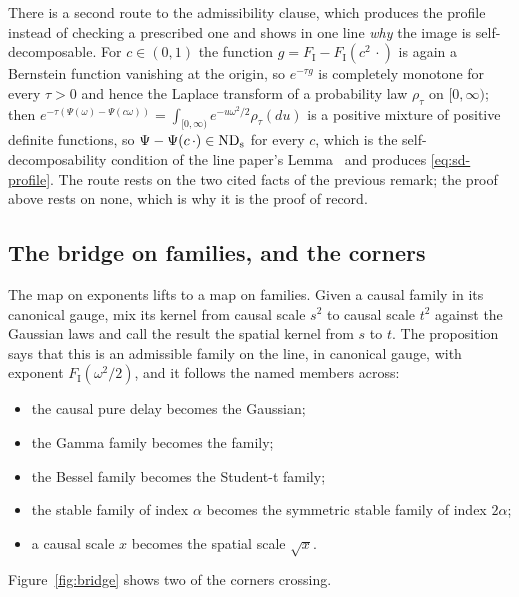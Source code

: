 \begin{remark}\label{rem:bridge-route}
There is a second route to the admissibility clause, which produces the profile instead of
checking a prescribed one and shows in one line \emph{why} the image is self-decomposable. For
$c \in (0,1)$ the function $g = F_{\mathrm I} - F_{\mathrm I}(c^2\,\cdot)$ is again a Bernstein
function vanishing at the origin, so $e^{-\tau g}$ is completely monotone for every $\tau > 0$
and hence the Laplace transform of a probability law $\rho_\tau$ on $[0,\infty)$; then
$e^{-\tau(\Psi(\omega) - \Psi(c\omega))} = \int_{[0,\infty)} e^{-u\omega^2/2}\rho_\tau(du)$ is a
positive mixture of positive definite functions, so $\Psi - \Psi(c\,\cdot) \in \mathrm{ND}_{\mathrm{s}}$ for every
$c$, which is the self-decomposability condition of the line paper's
Lemma~ and produces \ref{eq:sd-profile}. The route
rests on the two cited facts of the previous remark; the proof above rests on none, which is
why it is the proof of record.
\end{remark}

\subsection{The bridge on families, and the corners}\label{sec:bridge-families}

The map on exponents lifts to a map on families. Given a causal family in its canonical gauge,
mix its kernel from causal scale $s^2$ to causal scale $t^2$ against the Gaussian laws and
call the result the spatial kernel from $s$ to $t$. The proposition says that this is an
admissible family on the line, in canonical gauge, with exponent $F_{\mathrm I}(\omega^2/2)$,
and it follows the named members across:
\begin{itemize}
\item the causal pure delay becomes the Gaussian;
\item the Gamma family becomes the \Matern{} family;
\item the Bessel family becomes the Student-t family;
\item the stable family of index $\alpha$ becomes the symmetric stable family of index
$2\alpha$;
\item a causal scale $x$ becomes the spatial scale $\sqrt x$.
\end{itemize}
Figure~\ref{fig:bridge} shows two of the corners crossing.

